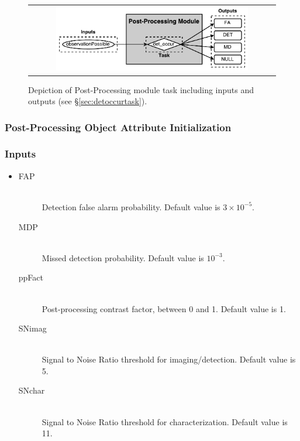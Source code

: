 \documentclass[cleanfoot]{asme2ej}
\begin{document}
\begin{figure}[ht]
    \begin{center}
        \begin{tabular}{c}
             \includegraphics[width=0.8\textwidth]{PostTasks}
        \end{tabular}
    \end{center}
    \caption{\label{fig:postprocessingmodule} Depiction of Post-Processing module task including inputs and outputs (see \S\ref{sec:detoccurtask}).}
\end{figure}

\subsubsection{Post-Processing Object Attribute Initialization}
\subsubsection*{Inputs}
\begin{itemize}
    \item 
    \begin{description}
          \item[FAP] \hfill \\
            Detection false alarm probability. Default value is $3 \times 10^{-5}$.
            \item[MDP] \hfill \\
            Missed detection probability. Default value is $10^{-3}$.
            \item[ppFact] \hfill \\
            Post-processing contrast factor, between 0 and 1. Default value is 1.
            \item[SNimag] \hfill \\
            Signal to Noise Ratio threshold for imaging/detection. Default value is 5.
            \item[SNchar] \hfill \\
            Signal to Noise Ratio threshold for characterization. Default value is 11.
        \end{description}
\end{itemize}
\end{document}
